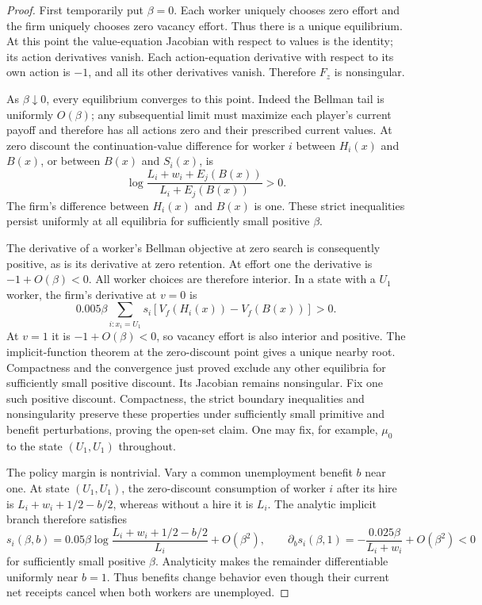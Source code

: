 \documentclass[11pt]{article}
\begin{document}
\begin{proof}
First temporarily put $\beta=0$. Each worker uniquely chooses zero effort and the firm uniquely chooses zero vacancy effort. Thus there is a unique equilibrium. At this point the value-equation Jacobian with respect to values is the identity; its action derivatives vanish. Each action-equation derivative with respect to its own action is $-1$, and all its other derivatives vanish. Therefore $F_z$ is nonsingular.

As $\beta\downarrow0$, every equilibrium converges to this point. Indeed the Bellman tail is uniformly $O(\beta)$; any subsequential limit must maximize each player's current payoff and therefore has all actions zero and their prescribed current values. At zero discount the continuation-value difference for worker $i$ between $H_i(x)$ and $B(x)$, or between $B(x)$ and $S_i(x)$, is
\[
 \log\frac{L_i+w_i+E_j(B(x))}{L_i+E_j(B(x))}>0.
\]
The firm's difference between $H_i(x)$ and $B(x)$ is one. These strict inequalities persist uniformly at all equilibria for sufficiently small positive $\beta$.

The derivative of a worker's Bellman objective at zero search is consequently positive, as is its derivative at zero retention. At effort one the derivative is $-1+O(\beta)<0$. All worker choices are therefore interior. In a state with a $U_1$ worker, the firm's derivative at $v=0$ is
\[
 0.005\beta\sum_{i:x_i=U_1}s_i
              [V_f(H_i(x))-V_f(B(x))]>0.
\]
At $v=1$ it is $-1+O(\beta)<0$, so vacancy effort is also interior and positive. The implicit-function theorem at the zero-discount point gives a unique nearby root. Compactness and the convergence just proved exclude any other equilibria for sufficiently small positive discount. Its Jacobian remains nonsingular. Fix one such positive discount. Compactness, the strict boundary inequalities and nonsingularity preserve these properties under sufficiently small primitive and benefit perturbations, proving the open-set claim. One may fix, for example, $\mu_0$ to the state $(U_1,U_1)$ throughout.

The policy margin is nontrivial. Vary a common unemployment benefit $b$ near one. At state $(U_1,U_1)$, the zero-discount consumption of worker $i$ after its hire is $L_i+w_i+1/2-b/2$, whereas without a hire it is $L_i$. The analytic implicit branch therefore satisfies
\[
 s_i(\beta,b)=0.05\beta\log\frac{L_i+w_i+1/2-b/2}{L_i}
                 +O(\beta^2),\qquad
 \partial_b s_i(\beta,1)=-\frac{0.025\beta}{L_i+w_i}+O(\beta^2)<0
\]
for sufficiently small positive $\beta$. Analyticity makes the remainder differentiable uniformly near $b=1$. Thus benefits change behavior even though their current net receipts cancel when both workers are unemployed.
\end{proof}
\end{document}
